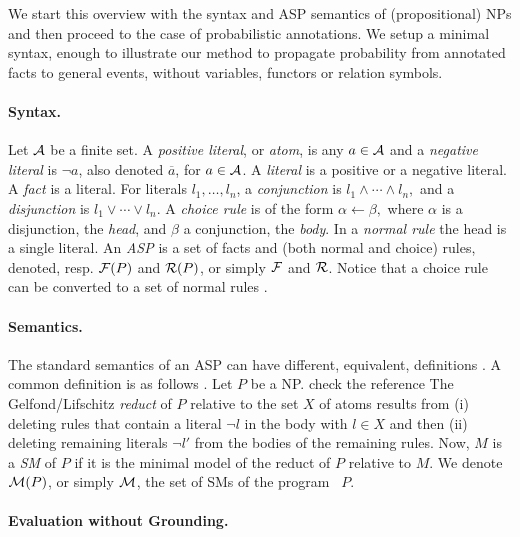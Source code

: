 \documentclass{tlp}
\renewcommand{\cite}{\citep}
\newcommand{\at}[1]{\ensuremath{\!\del{#1}}}        %
\newcommand{\cla}[1]{\ensuremath{{\cal #1}}}        %
\newcommand{\conj}{\ensuremath{\wedge}} \newcommand{\disj}{\ensuremath{\vee}}
\newcommand{\clause}{\ensuremath{\leftarrow}}
\newcommand{\co}[1]{\ensuremath{\overline{#1}}}     %
\newcommand{\ATOMSset}{\ensuremath{\cla{A}}}
\newcommand{\FACTSset}{\ensuremath{\cla{F}}}
\newcommand{\RULESset}{\ensuremath{\cla{R}}}
\newcommand{\MODELset}{\ensuremath{\cla{M}}}
\newcommand{\franc}[1]{{\color{green!30!black}#1}}
\begin{document}
We start this overview with the syntax and \ac{ASP} semantics of
(propositional) \aclp{NP} and then proceed to the case of
probabilistic annotations.  We setup a minimal syntax, enough to
illustrate our method to propagate probability from annotated facts to
general events, without variables, functors or relation symbols.


\paragraph{Syntax.}

Let \(\ATOMSset\) be a finite set.
A \textit{positive literal}, or \textit{atom},
is any \(a \in \ATOMSset\)
and a \textit{negative literal} is \(\neg a\), also denoted \(\co{a}\),
for \(a\in\ATOMSset\).
A \textit{literal} is a positive or a negative literal.
A \textit{fact} is a literal.
For literals $l_1, \ldots, l_n$, a \emph{conjunction} is
  \( l _1 \conj \cdots \conj l_n, \)
and a \textit{disjunction} is
  \( l_1 \disj \cdots \disj l_n. \)
A \textit{choice rule} is of the form
   \( \alpha \clause \beta, \)
where $\alpha$ is a disjunction, the \textit{head},
and \(\beta\) a conjunction, the \textit{body}.
In a \textit{normal rule} the head is a single literal.
An \textit{\acf{ASP}} is a set of facts and
(both normal and choice) rules, denoted, resp. $\FACTSset\at{P}$ and
$\RULESset\at{P}$, or simply $\FACTSset$ and $\RULESset$.
Notice that a choice rule can be converted to a set of normal rules
\cite{gebser2022answer}.


\paragraph{Semantics.}

The standard semantics of an \ac{ASP} can have different, equivalent,
definitions \cite{lifschitz2008twelve}.  A common definition is as
follows \cite{gelfond1988stable}.  Let \(P\) be a \acl{NP}.
\franc{check the reference} The Gelfond/Lifschitz \emph{reduct} of
\(P\) relative to the set $X$ of atoms results from (i) deleting rules
that contain a literal \(\neg l\) in the body with \(l \in X\) and
then (ii) deleting remaining literals \(\neg l'\) from the bodies of
the remaining rules.  Now, \(M\) is a \textit{\acf{SM}} of \(P\) if it
is the minimal model of the reduct of \(P\) relative to \(M\).  We
denote \(\MODELset\at{P}\), or simply \(\MODELset\), the set of
\aclp{SM} of the program~ \(P\).


\paragraph{Evaluation without Grounding.}
\end{document}

